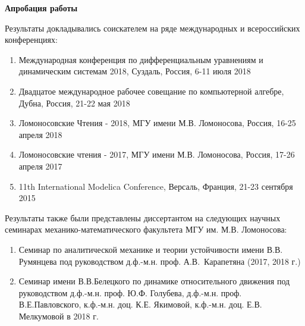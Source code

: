 
\textbf{Апробация работы}

Результаты докладывались соискателем на ряде международных и всероссийских конференциях:
\begin{enumerate}
    \item Международная конференция по дифференциальным уравнениям и динамическим системам 2018, Суздаль, Россия, 6-11 июля 2018
    \item Двадцатое международное рабочее совещание по компьютерной алгебре, Дубна, Россия, 21-22 мая 2018
    \item Ломоносовские Чтения - 2018, МГУ имени М.В. Ломоносова, Россия, 16-25 апреля 2018
    \item Ломоносовские чтения - 2017, МГУ имени М.В. Ломоносова, Россия, 17-26 апреля 2017
    \item 11th International Modelica Conference, Версаль, Франция, 21-23 сентября 2015
\end{enumerate}
Результаты также были представлены диссертантом на следующих научных семинарах механико-математического факультета МГУ им. М.В. Ломоносова:
\begin{enumerate}
    \item Семинар по аналитической механике и теории устойчивости имени В.В. Румянцева под руководством д.ф.-м.н. проф. А.В.~Карапетяна (2017, 2018 г.)
    \item Семинар имени В.В.Белецкого по динамике относительного движения под руководством д.ф.-м.н. проф. Ю.Ф. Голубева, д.ф.-м.н. проф. В.Е.Павловского, к.ф.-м.н. доц. К.Е. Якимовой, к.ф.-м.н. доц. Е.В. Мелкумовой в 2018 г.
\end{enumerate}

